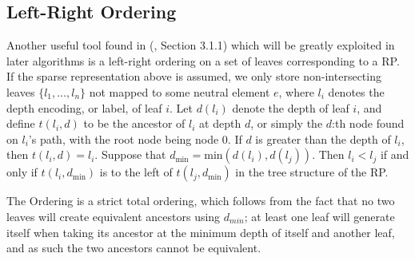 \documentclass{report}
\begin{document}
\subsection{Left-Right Ordering}
Another useful tool found in (\cite{Scalable Algorithms}, Section 3.1.1) which will be greatly exploited in later algorithms is a left-right ordering on a set of leaves corresponding to a RP.
If the sparse representation above is assumed, 
we only store non-intersecting leaves $\{l_1, \dots, l_n\}$ not mapped to some neutral element $e$, where $l_i$ denotes the depth encoding, or label, of leaf $i$. Let $d(l_i)$ denote the depth of leaf $i$, and define 
$t(l_i,d)$ to be the ancestor of $l_i$ at depth $d$, or simply the $d$:th node found on $l_i$'s path, with the root node being node 0. If $d$ is greater than the depth of $l_i$, then $t(l_i,d) = l_i$.
Suppose that $d_{\text{min}} = \text{min}(d(l_i), d(l_j))$. Then $l_i < l_j$ if and only if $t(l_i, d_{\text{min}})$ is to the left of $t(l_j, d_{\text{min}})$ in the tree structure of the RP.

The Ordering is a strict total ordering, which follows from the fact that no two leaves will create equivalent ancestors using $d_{min}$; at least one leaf will generate itself when taking its ancestor at the minimum 
depth of itself and another leaf, and as such the two ancestors cannot be equivalent.
\end{document}
